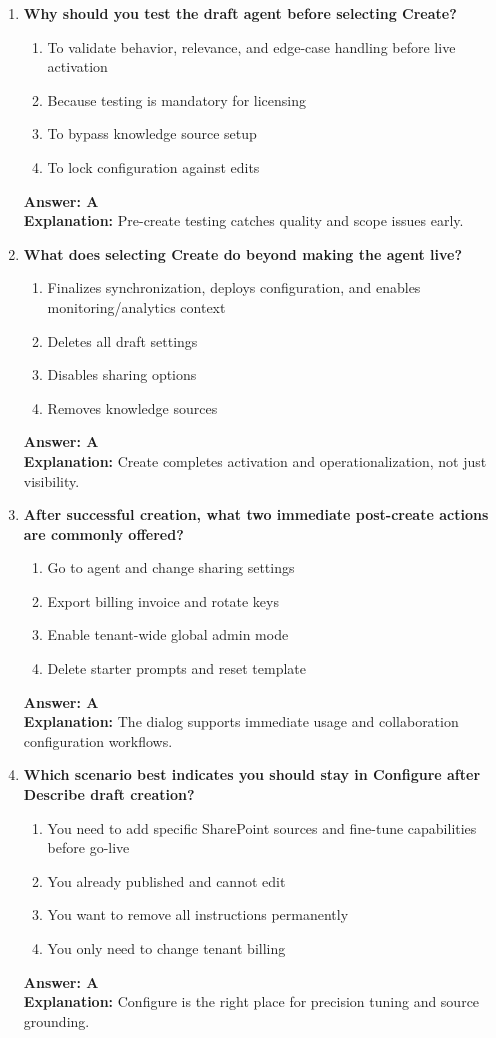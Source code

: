 \documentclass[10pt]{article}
\begin{document}
\begin{enumerate}[leftmargin=*]
\item \textbf{Why should you test the draft agent before selecting Create?}
\begin{enumerate}[label=\Alph*.]
  \item To validate behavior, relevance, and edge-case handling before live activation
  \item Because testing is mandatory for licensing
  \item To bypass knowledge source setup
  \item To lock configuration against edits
\end{enumerate}
\textbf{Answer: A}\\
\textbf{Explanation:} Pre-create testing catches quality and scope issues early.

\item \textbf{What does selecting Create do beyond making the agent live?}
\begin{enumerate}[label=\Alph*.]
  \item Finalizes synchronization, deploys configuration, and enables monitoring/analytics context
  \item Deletes all draft settings
  \item Disables sharing options
  \item Removes knowledge sources
\end{enumerate}
\textbf{Answer: A}\\
\textbf{Explanation:} Create completes activation and operationalization, not just visibility.

\item \textbf{After successful creation, what two immediate post-create actions are commonly offered?}
\begin{enumerate}[label=\Alph*.]
  \item Go to agent and change sharing settings
  \item Export billing invoice and rotate keys
  \item Enable tenant-wide global admin mode
  \item Delete starter prompts and reset template
\end{enumerate}
\textbf{Answer: A}\\
\textbf{Explanation:} The dialog supports immediate usage and collaboration configuration workflows.

\item \textbf{Which scenario best indicates you should stay in Configure after Describe draft creation?}
\begin{enumerate}[label=\Alph*.]
  \item You need to add specific SharePoint sources and fine-tune capabilities before go-live
  \item You already published and cannot edit
  \item You want to remove all instructions permanently
  \item You only need to change tenant billing
\end{enumerate}
\textbf{Answer: A}\\
\textbf{Explanation:} Configure is the right place for precision tuning and source grounding.


\end{enumerate}
\end{document}
